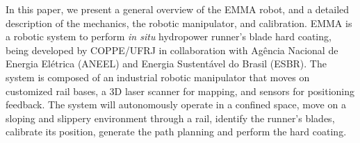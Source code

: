 In this paper, we present a general overview of the EMMA robot, and a detailed
description of the mechanics, the robotic manipulator, and calibration. EMMA is
a robotic system to perform \textit{in situ} hydropower runner's blade hard
coating, being developed by COPPE/UFRJ in collaboration with Agência Nacional
de Energia Elétrica (ANEEL) and Energia Sustentável do Brasil (ESBR). The
system is composed of an industrial robotic manipulator that moves on customized
rail bases, a 3D laser scanner for mapping, and sensors for positioning
feedback. The system will autonomously operate in a confined space, move
on a sloping and slippery environment through a rail, identify the runner's
blades, calibrate its position, generate the path planning and perform the hard
coating. 

\begin{comment}
This text is organized as follows: a general overview of the robot and its main
challenges are presented in Section \ref{sec:general_overview}, detailed
descriptions of the embedded electronics, the vehicle support system, power
supply system, and software architecture are taken in
Sections \ref{sec:electronics_overview}, \ref{sec:powersupply_overview}, and
\ref{sec:software} respectively.
In Section \ref{sec:results}, preliminary results are shown, and concluding
remarks are drawn in Section \ref{sec:conclusions}.
\end{comment}